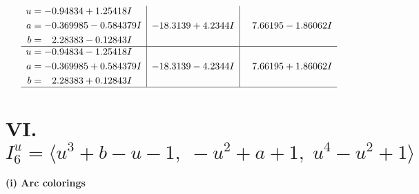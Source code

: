\documentclass[1p]{elsarticle_modified}
\theoremstyle{definition}
\begin{document}
$$\begin{array}{c|c|c}
\begin{aligned}
u &= -0.94834 + 1.25418 I \\
a &= -0.369985 - 0.584379 I \\
b &= \phantom{-}2.28383 - 0.12843 I\end{aligned}
 & -18.3139 + 4.2344 I & \phantom{-}7.66195 - 1.86062 I \\ \hline\begin{aligned}
u &= -0.94834 - 1.25418 I \\
a &= -0.369985 + 0.584379 I \\
b &= \phantom{-}2.28383 + 0.12843 I\end{aligned}
 & -18.3139 - 4.2344 I & \phantom{-}7.66195 + 1.86062 I\\
 \hline 
 \end{array}$$\newpage\newpage\renewcommand{\arraystretch}{1}
\centering \section*{VI. $I^u_{6}= \langle u^3+b- u-1,\;- u^2+a+1,\;u^4- u^2+1 \rangle$}
\flushleft \textbf{(i) Arc colorings}\\
\end{document}
